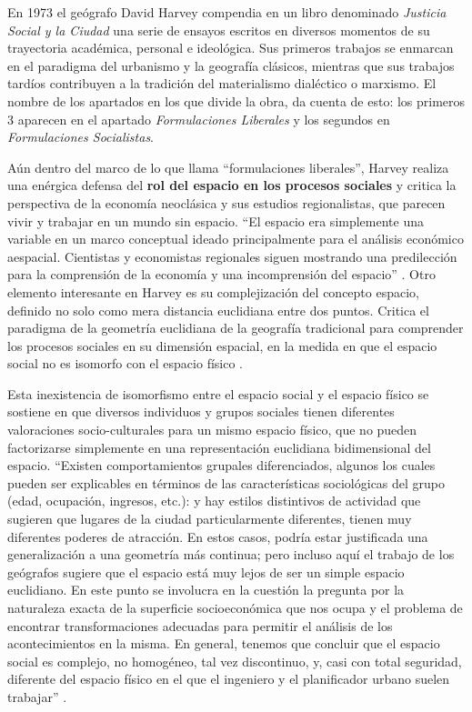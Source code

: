 En 1973 el geógrafo David Harvey compendia en un libro denominado \textit{Justicia Social y la Ciudad} una serie de ensayos escritos en diversos momentos de su trayectoria académica, personal e ideológica. Sus primeros trabajos se enmarcan en el paradigma del urbanismo y la geografía clásicos, mientras que sus trabajos tardíos contribuyen a la tradición del materialismo dialéctico o marxismo. El nombre de los apartados en los que divide la obra, da cuenta de esto: los primeros 3 aparecen en el apartado \textit{Formulaciones Liberales} y los segundos en \textit{Formulaciones Socialistas}.  

Aún dentro del marco de lo que llama “formulaciones liberales”, Harvey realiza una enérgica defensa del \textbf{rol del espacio en los procesos sociales} y critica la perspectiva de la economía neoclásica y sus estudios regionalistas, que parecen vivir y trabajar en un mundo sin espacio. “El espacio era simplemente una variable en un marco conceptual ideado principalmente para el análisis económico aespacial. Cientistas y economistas regionales siguen mostrando una predilección para la comprensión de la economía y una incomprensión del espacio” \cite[~26]{harvey}. Otro elemento interesante en Harvey es su complejización del concepto espacio, definido no solo como mera distancia euclidiana entre dos puntos. Critica el paradigma de la geometría euclidiana de la geografía tradicional para comprender los procesos sociales en su dimensión espacial, en la medida en que el espacio social no es isomorfo con el espacio físico \cite[~29]{harvey}.

Esta inexistencia de isomorfismo entre el espacio social y el espacio físico se sostiene en que diversos individuos y grupos sociales tienen diferentes valoraciones socio-culturales para un mismo espacio físico, que no pueden factorizarse simplemente en una representación euclidiana bidimensional del espacio. “Existen comportamientos grupales diferenciados, algunos los cuales pueden ser explicables en términos de las características sociológicas del grupo (edad, ocupación, ingresos, etc.): y hay estilos distintivos de actividad que sugieren que lugares de la ciudad particularmente diferentes, tienen muy diferentes poderes de atracción. En estos casos, podría estar justificada una generalización a una geometría más continua; pero incluso aquí el trabajo de los geógrafos sugiere que el espacio está muy lejos de ser un simple espacio euclidiano. En este punto se involucra en la cuestión la pregunta por la naturaleza exacta de la superficie socioeconómica que nos ocupa y el problema de encontrar transformaciones adecuadas para permitir el análisis de los acontecimientos en la misma. En general, tenemos que concluir que el espacio social es complejo, no homogéneo, tal vez discontinuo, y, casi con total seguridad, diferente del espacio físico en el que el ingeniero y el planificador urbano suelen trabajar” \cite[~35]{harvey}.

